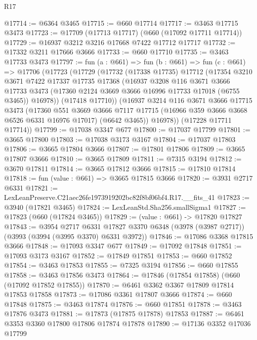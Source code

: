 \begin{lexlean}{R17}
\begin{coremodule}
@17714 := @6364 @3465
@17715 := @660 @17714
@17717 := @3463 @17715 @3473
@17723 := @17709 (@17713 @17717) (@660 (@17092 @17711 @17714))
@17729 := @16937 @3212 @3216 @17668 @7422 @17712 @17717
@17732 := @17332 @3211 @17666 @3666
@17733 := @660 @17710
@17735 := @3463 @17733 @3473
@17797 := fun (a : @661) =>
  fun (b : @661) =>
  fun (c : @661) =>
  @17706
    (@17723
      (@17729
        (@17732
          (@17338 @17735)
          @17712
          (@17354
            @3210
            @3671
            @7422
            @17337
            @17735
            @17368
            (@16937
              @3208
              @116
              @3671
              @3666
              @17733
              @3473
              (@17360 @2124 @3669 @3666 @16996 @17733 @17018 (@6755 @3465))
              @16978))
          (@17418 @17710))
        (@16937
          @3214
          @116
          @3671
          @3666
          @17715
          @3473
          (@17360
            @551
            @3669
            @3666
            @7117
            @17715
            (@16966 @359 @3666 @3668 @6526 @6331 @16976 @17017)
            (@6642 @3465))
          @16978))
      (@17228 @17711 @17714))
@17799 := @17038 @3347 @677
@17800 := @17037 @17799
@17801 := @3665 @17800
@17803 := @17038 @3173 @3167
@17804 := @17037 @17803
@17806 := @3665 @17804 @3666
@17807 := @17801 @17806
@17809 := @3665 @17807 @3666
@17810 := @3665 @17809
@17811 := @7315 @3194
@17812 := @3670 @17811
@17814 := @3665 @17812 @3666
@17815 := @17810 @17814
@17818 := fun (value : @661) => @3665 @17815 @3666
@17820 := @3931 @2717 @6331
@17821 := LexLeanPreserve.C21aec26fe1973919202bc82f8bf06bf4.R17.__fits_41
@17823 := @3940 (@17821 @3465)
@17824 := LexLeanStd.Sha256.smallSigma1
@17827 := @17823 (@660 (@17824 @3465))
@17829 := (value : @661) -> @17820 @17827
@17843 := @3954
    @2717
    @6331
    @17827
    @3370
    @6348
    (@3978 (@3987 @2717))
    (@3993 (@3994 (@3995 @3370) @6331 @3972))
@17846 := @17086 @3368 @17815 @3666
@17848 := @17093 @3347 @677
@17849 := @17092 @17848
@17851 := @17093 @3173 @3167
@17852 := @17849 @17851
@17853 := @660 @17852
@17854 := @3463 @17853
@17855 := @7325 @3194
@17856 := @660 @17855
@17858 := @3463 @17856 @3473
@17864 := @17846 (@17854 @17858) (@660 (@17092 @17852 @17855))
@17870 := @6461 @3362 @3367 @17809 @17814 @17853 @17858
@17873 := @17086 @3361 @17807 @3666
@17874 := @660 @17848
@17875 := @3463 @17874
@17876 := @660 @17851
@17878 := @3463 @17876 @3473
@17881 := @17873 (@17875 @17878) @17853
@17887 := @6461 @3353 @3360 @17800 @17806 @17874 @17878
@17890 := @17136 @3352 @17036 @17799

\end{coremodule}
\end{lexlean}
